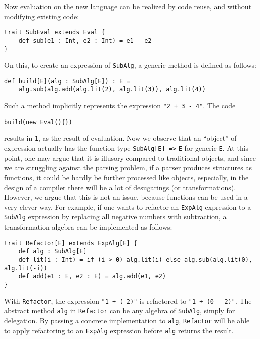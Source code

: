 Now evaluation on the new language can be realized by code reuse, and without modifying existing code:
\begin{lstlisting}
trait SubEval extends Eval {
    def sub(e1 : Int, e2 : Int) = e1 - e2
}
\end{lstlisting}
On this, to create an expression of \lstinline{SubAlg}, a generic method is defined as follows:
\begin{lstlisting}
def build[E](alg : SubAlg[E]) : E =
    alg.sub(alg.add(alg.lit(2), alg.lit(3)), alg.lit(4))
\end{lstlisting}
Such a method implicitly represents the expression \lstinline{"2 + 3 - 4"}. The code
\begin{lstlisting}
build(new Eval(){})
\end{lstlisting}
results in \lstinline{1}, as the result of evaluation. Now we observe that an ``object'' of expression actually
has the function type \lstinline{SubAlg[E] =>} \lstinline{E} for generic \lstinline{E}. At this point, one may argue
that it is illusory compared to traditional objects, and since we are struggling against the parsing problem, if a parser
produces structures as functions, it could be hardly be further processed like objects, especially, in the design of a compiler
there will be a lot of desugarings (or transformations). However, we argue that this is not an issue, because functions can be used
in a very clever way. For example, if one wants to refactor an \lstinline{ExpAlg} expression to a \lstinline{SubAlg} expression by
replacing all negative numbers with subtraction, a transformation algebra can be implemented as follows:
\begin{lstlisting}
trait Refactor[E] extends ExpAlg[E] {
    def alg : SubAlg[E]
    def lit(i : Int) = if (i > 0) alg.lit(i) else alg.sub(alg.lit(0), alg.lit(-i))
    def add(e1 : E, e2 : E) = alg.add(e1, e2)
}
\end{lstlisting}
With \lstinline{Refactor}, the expression \lstinline{"1 + (-2)"} is refactored to \lstinline{"1 + (0 - 2)"}. The abstract method
\lstinline{alg} in \lstinline{Refactor} can be any algebra of \lstinline{SubAlg}, simply for delegation. By passing a concrete implementation
to \lstinline{alg}, \lstinline{Refactor} will be able to apply refactoring to an \lstinline{ExpAlg} expression before \lstinline{alg} returns the result.
